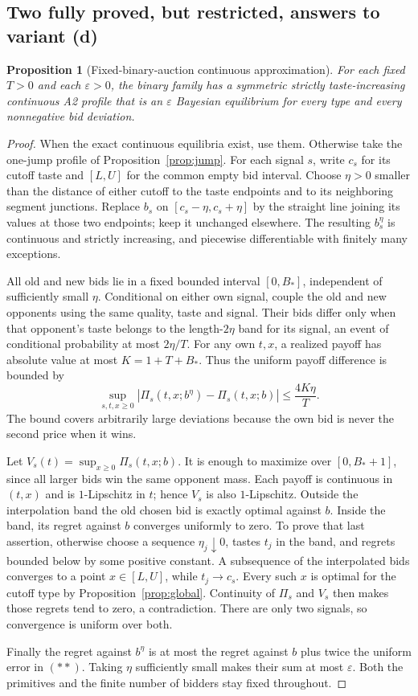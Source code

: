 \documentclass[11pt,a4paper]{article}
\newtheorem{proposition}[theorem]{Proposition}
\theoremstyle{remark}\newtheorem{remark}[theorem]{Remark}
\begin{document}
\subsection{Two fully proved, but restricted, answers to variant (d)}
\begin{proposition}[Fixed-binary-auction continuous approximation]
For each fixed $T>0$ and each $\varepsilon>0$, the binary family has a symmetric strictly taste-increasing continuous A2 profile that is an $\varepsilon$ Bayesian equilibrium for every type and every nonnegative bid deviation.
\end{proposition}
\begin{proof}
When the exact continuous equilibria exist, use them. Otherwise take the one-jump profile of Proposition~\ref{prop:jump}. For each signal $s$, write $c_s$ for its cutoff taste and $[L,U]$ for the common empty bid interval. Choose $\eta>0$ smaller than the distance of either cutoff to the taste endpoints and to its neighboring segment junctions. Replace $b_s$ on $[c_s-\eta,c_s+\eta]$ by the straight line joining its values at those two endpoints; keep it unchanged elsewhere. The resulting $b_s^\eta$ is continuous and strictly increasing, and piecewise differentiable with finitely many exceptions.

All old and new bids lie in a fixed bounded interval $[0,B_*]$, independent of sufficiently small $\eta$. Conditional on either own signal, couple the old and new opponents using the same quality, taste and signal. Their bids differ only when that opponent's taste belongs to the length-$2\eta$ band for its signal, an event of conditional probability at most $2\eta/T$. For any own $t,x$, a realized payoff has absolute value at most $K=1+T+B_*$. Thus the uniform payoff difference is bounded by
\[
 \sup_{s,t,x\ge0}|\Pi_s(t,x;b^\eta)-\Pi_s(t,x;b)|
 \le\frac{4K\eta}{T}.\tag{**}
\]
The bound covers arbitrarily large deviations because the own bid is never the second price when it wins.

Let $V_s(t)=\sup_{x\ge0}\Pi_s(t,x;b)$. It is enough to maximize over $[0,B_*+1]$, since all larger bids win the same opponent mass. Each payoff is continuous in $(t,x)$ and is $1$-Lipschitz in $t$; hence $V_s$ is also $1$-Lipschitz. Outside the interpolation band the old chosen bid is exactly optimal against $b$. Inside the band, its regret against $b$ converges uniformly to zero. To prove that last assertion, otherwise choose a sequence $\eta_j\downarrow0$, tastes $t_j$ in the band, and regrets bounded below by some positive constant. A subsequence of the interpolated bids converges to a point $x\in[L,U]$, while $t_j\to c_s$. Every such $x$ is optimal for the cutoff type by Proposition~\ref{prop:global}. Continuity of $\Pi_s$ and $V_s$ then makes those regrets tend to zero, a contradiction. There are only two signals, so convergence is uniform over both.

Finally the regret against $b^\eta$ is at most the regret against $b$ plus twice the uniform error in $(**)$. Taking $\eta$ sufficiently small makes their sum at most $\varepsilon$. Both the primitives and the finite number of bidders stay fixed throughout.
\end{proof}
\end{document}
